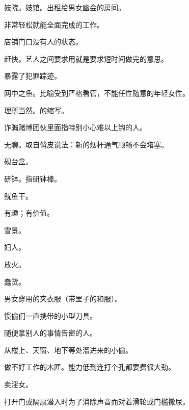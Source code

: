 \orignextpage

{妓院。妓馆。出租给男女幽会的房间。}

{非常轻松就能全面完成的工作。}

{店铺门口没有人的状态。}

{赶快。艺人之间要求用就是要求短时间做完的意思。}

{暴露了犯罪踪迹。}

{网中之鱼。比喻受到严格看管，不能任性随意的年轻女性。}

{理所当然。的缩写。}

{诈骗赌博团伙里面指特别小心难以上钩的人。}

{无聊。取自俏皮说法：新的烟杆通气顺畅不会堵塞。}

{砚台盒。}

{研钵。指研钵棒。}

{鱿鱼干。}

{有趣；有价值。}

{雪景。}

{妇人。}

{放火。}

{蠢货。}

{男女穿用的夹衣服（带里子的和服）。}

{惯偷们一直携带的小型刀具。}

{随便拿别人的事情告密的人。}

{从楼上、天窗、地下等处溜进来的小偷。}

{做不好工作的木匠。能力低到连打个孔都要费很大劲。}

{卖淫女。}

{打开门或隔扇潜入时为了消除声音而对着滑轮或门槛撒尿。}

